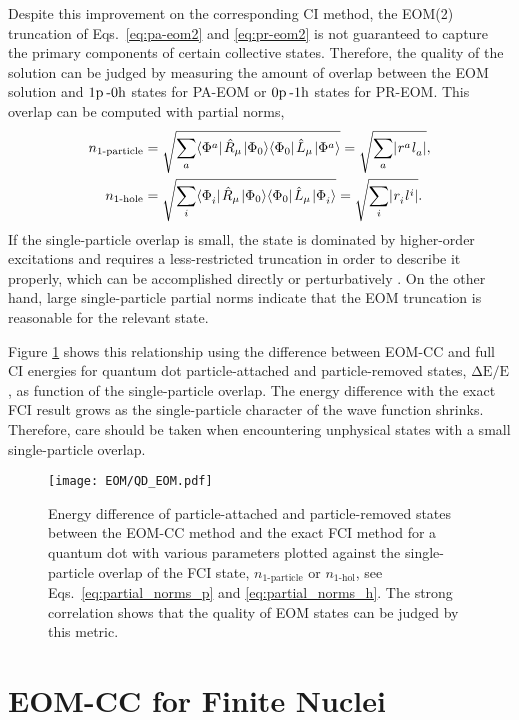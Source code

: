 \documentclass[thesis.tex]{subfiles}
\begin{document}
Despite this improvement on the corresponding CI method, the EOM(2) truncation of Eqs.\ \eqref{eq:pa-eom2} and \eqref{eq:pr-eom2} is not guaranteed to capture the primary components of certain collective states.  Therefore, the quality of the solution can be judged by measuring the amount of overlap between the EOM solution and $1\mathrm{p}\hspace{2pt}\text{-}0\mathrm{h}$ states for PA-EOM or $0\mathrm{p}\hspace{2pt}\text{-}1\mathrm{h}$ states for PR-EOM.  This overlap can be computed with partial norms,
\begin{align}
  \label{eq:partial_norms_p}
  n_{\text{1-particle}} &= \sqrt{\sum_{a} \langle \Phi^{a}_{} |\hspace{1pt}\hat{R}\hspace{-0.1pt}_{\mu}\hspace{1pt}\lvert \Phi_{0} \rangle\langle \Phi_{0} |\hspace{1pt}\hat{L}\hspace{-0.1pt}_{\mu}\hspace{1pt}\lvert \Phi^{a}_{} \rangle } = \sqrt{\sum_{a} \lvert {}^{}r^{a}_{}{}^{}l^{\hspace{0.1pt}}_{a} \rvert },\\
  \label{eq:partial_norms_h}
  n_{\text{1-hole}} &= \sqrt{\sum_{i} \langle \Phi^{}_{i} |\hspace{1pt}\hat{R}\hspace{-0.1pt}_{\mu}\hspace{1pt}\lvert \Phi_{0} \rangle\langle \Phi_{0} |\hspace{1pt}\hat{L}\hspace{-0.1pt}_{\mu}\hspace{1pt}\lvert \Phi^{}_{i} \rangle } = \sqrt{\sum_{i} \lvert {}^{}r^{}_{i}{}^{}l^{\hspace{0.1pt}i}_{} \rvert }.
\end{align}
If the single-particle overlap is small, the state is dominated by higher-order excitations and requires a less-restricted truncation in order to describe it properly, which can be accomplished directly or perturbatively \cite{PARZUCHOWSKI2017044304,MORRIS2017}.  On the other hand, large single-particle partial norms indicate that the EOM truncation is reasonable for the relevant state.

Figure \ref{fig:EOM-Quality} shows this relationship using the difference between EOM-CC and full CI energies for quantum dot particle-attached and particle-removed states, $\mathrm{\Delta E/E}$, as function of the single-particle overlap.  The energy difference with the exact FCI result grows as the single-particle character of the wave function shrinks.  Therefore, care should be taken when encountering unphysical states with a small single-particle overlap.
\begin{figure}[h]
  \centering
  \texttt{[image: EOM/QD\_EOM.pdf]}
  \caption{Energy difference of particle-attached and particle-removed states between the EOM-CC method and the exact FCI method for a quantum dot with various parameters plotted against the single-particle overlap of the FCI state, $n_{\text{1-particle}}$ or $n_{\text{1-hol}}$, see Eqs.\ \eqref{eq:partial_norms_p} and \eqref{eq:partial_norms_h}.  The strong correlation shows that the quality of EOM states can be judged by this metric.}
  \label{fig:EOM-Quality}
\end{figure}


\section{EOM-CC for Finite Nuclei} \label{section:eom_nuclei}
\end{document}
